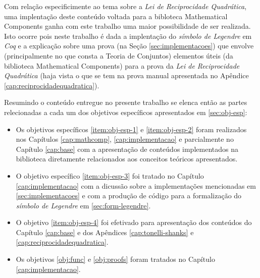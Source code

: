 Com relação especificimente ao tema sobre a \textit{Lei de Reciprocidade Quadrática}, uma implentação deste conteúdo voltada para a bibloteca Mathematical Components ganha com este trabalho uma maior possibilidade de ser realizada. Isto ocorre pois neste trabalho é dada a implentação do \textit{símbolo de Legendre} em \textit{Coq} e a explicação sobre uma prova (na Seção \ref{sec:implementacoes}) que envolve (principalmente no que consta a Teoria de Conjuntos) elementos úteis (da biblioteca Mathematical Components) para a prova da \textit{Lei de Reciprocidade Quadrática} (haja vista o que se tem na prova manual apresentada no Apêndice \ref{cap:reciprocidadequadratica}).

Resumindo o conteúdo entregue no presente trabalho se elenca então as partes relecionadas a cada um dos objetivos específicos apresentados em \ref{sec:obj-esp}: 
\begin{itemize}
    \item Os objetivos específicos \ref{item:obj-esp-1} e \ref{item:obj-esp-2} foram realizados nos Capítulos \ref{cap:mathcomp}, \ref{cap:implementacao} e parcialmente no Capítulo \ref{cap:base} com a apresentação de conteúdos implementados na biblioteca diretamente relacionados aos conceitos teóricos apresentados.  
    
    \item O objetivo específico \ref{item:obj-esp-3} foi tratado no Capítulo \ref{cap:implementacao} com a dicussão sobre a implementações mencionadas em \ref{sec:implementacoes} e com a produção de código para a formalização do \textit{símbolo de Legendre} em \ref{sec:form-legendre}.
    
    \item O objetivo \ref{item:obj-esp-4} foi efetivado para apresentação dos conteúdos do Capítulo \ref{cap:base} e dos Apêndices \ref{cap:tonelli-shanks} e \ref{cap:reciprocidadequadratica}.
    
    \item Os objetivos \ref{obj:func} e \ref{obj:proofs} foram tratados no Capítulo \ref{cap:implementacao}.
\end{itemize}

